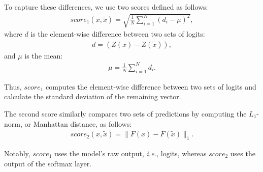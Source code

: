 To capture these differences, we use two scores defined as follows:
\begin{align}
    \label{eq:score1}
    score_{1}{(x,\tilde{x})}=\sqrt{\frac{1}{N}\sum_{i=1}^{N}(d_{i}-\mu)^{2}},
\end{align}
where $d$ is the element-wise difference between two sets of logits:
\begin{align}
    \label{eq:diff}
    d=(Z(x)-Z(\tilde{x})),
\end{align}
and $\mu$ is the mean:
\begin{align}
    \label{eq:mean_mu}
    \mu=\frac{1}{N}\sum_{i=1}^{N}d_{i}.
\end{align}

Thus, $score_{1}$ computes the element-wise difference between two sets of
logits and calculate the standard deviation of the remaining vector.

The second score similarly compares two sets of predictions by computing the
$L_1$-norm, or Manhattan distance, as follows:
\begin{align}
    \label{eq:score2}
    score_{2}{(x,\tilde{x})}=\|F(x)-F(\tilde{x})\|_{1}.
\end{align}

Notably, $score_{1}$ uses the model's raw output, \emph{i.e.,} logits, whereas
$score_{2}$ uses the output of the softmax layer.

